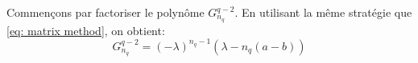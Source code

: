 Commençons par factoriser le polynôme $G_{n_q}^{q-2}$.
En utilisant la même stratégie que \eqref{eq: matrix method}, on obtient:
\begin{equation}
	G_{n_q}^{q-2} = (-\lambda)^{n_q - 1} (\lambda - n_q(a-b))
\end{equation}
